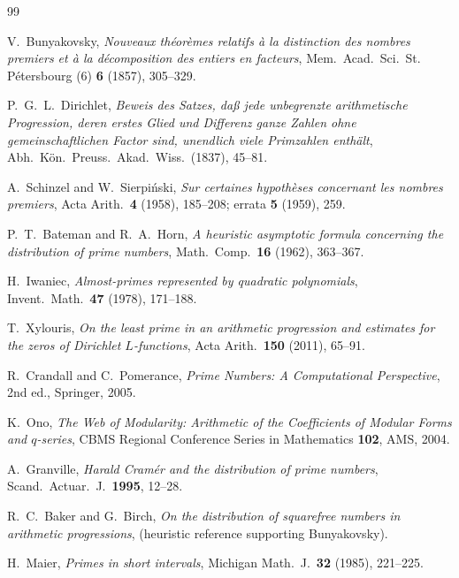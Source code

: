 \documentclass[12pt,a4paper]{amsart}
\theoremstyle{definition}
\theoremstyle{remark}
\begin{document}
\begin{thebibliography}{99}

V.\ Bunyakovsky,
\textit{Nouveaux théorèmes relatifs à la distinction des nombres premiers et à la
décomposition des entiers en facteurs},
Mem.\ Acad.\ Sci.\ St.\,Pétersbourg (6) \textbf{6} (1857), 305--329.

P.\ G.\ L.\ Dirichlet,
\textit{Beweis des Satzes, daß jede unbegrenzte arithmetische Progression,
deren erstes Glied und Differenz ganze Zahlen ohne gemeinschaftlichen Factor sind,
unendlich viele Primzahlen enthält},
Abh.\ Kön.\ Preuss.\ Akad.\ Wiss.\ (1837), 45--81.

A.\ Schinzel and W.\ Sierpiński,
\textit{Sur certaines hypothèses concernant les nombres premiers},
Acta Arith.\ \textbf{4} (1958), 185--208; errata \textbf{5} (1959), 259.

P.\ T.\ Bateman and R.\ A.\ Horn,
\textit{A heuristic asymptotic formula concerning the distribution of prime numbers},
Math.\ Comp.\ \textbf{16} (1962), 363--367.

H.\ Iwaniec,
\textit{Almost-primes represented by quadratic polynomials},
Invent.\ Math.\ \textbf{47} (1978), 171--188.

T.\ Xylouris,
\textit{On the least prime in an arithmetic progression and estimates for the
zeros of Dirichlet $L$-functions},
Acta Arith.\ \textbf{150} (2011), 65--91.

R.\ Crandall and C.\ Pomerance,
\textit{Prime Numbers: A Computational Perspective},
2nd ed., Springer, 2005.

K.\ Ono,
\textit{The Web of Modularity: Arithmetic of the Coefficients of Modular Forms
and $q$-series},
CBMS Regional Conference Series in Mathematics \textbf{102}, AMS, 2004.

A.\ Granville,
\textit{Harald Cramér and the distribution of prime numbers},
Scand.\ Actuar.\ J.\ \textbf{1995}, 12--28.

R.\ C.\ Baker and G.\ Birch,
\textit{On the distribution of squarefree numbers in arithmetic progressions},
(heuristic reference supporting Bunyakovsky).

H.\ Maier,
\textit{Primes in short intervals},
Michigan Math.\ J.\ \textbf{32} (1985), 221--225.

\end{thebibliography}
\end{document}
